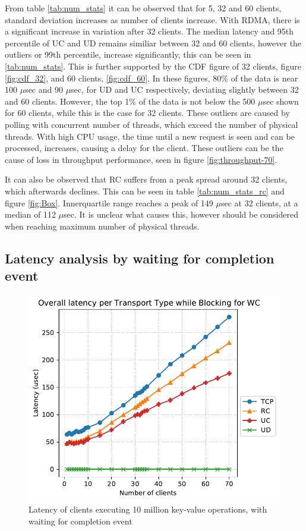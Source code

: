 From table \ref{tab:num_stats} it can be observed that for 5, 32 and 60 clients, standard deviation increases as number of clients increase.
With RDMA, there is a significant increase in variation after 32 clients.
The median latency and 95th percentile of UC and UD remains similiar between 32 and 60 clients, however the outliers or 99th percentile, increase significantly, this can be seen in \ref{tab:num_stats}.
This is further supported by the CDF figure of 32 clients, figure \ref{fig:cdf_32}, and 60 clients, \ref{fig:cdf_60}.
In these figures, 80\% of the data is near 100 $\mu$sec and 90 $\mu$sec, for UD and UC respectively, deviating slightly between 32 and 60 clients.
However, the top 1\% of the data is not below the 500 $\mu$sec shown for 60 clients, while this is the case for 32 clients.
These outliers are caused by polling with concurrent number of threads, which exceed the number of physical threads.
With high CPU usage, the time until a new request is seen and can be processed, increases, causing a delay for the client.
These outliers can be the cause of loss in throughput performance, seen in figure \ref{fig:throughput-70}.

It can also be observed that RC suffers from a peak spread around 32 clients, which afterwards declines.
This can be seen in table \ref{tab:num_stats_rc} and figure \ref{fig:Box}.
Innerquartile range reaches a peak of 149 $\mu$sec at 32 clients, at a median of 112 $\mu$sec.
It is unclear what causes this, however should be considered when reaching maximum number of physical threads.

\subsection{Latency analysis by waiting for completion event}

\begin{figure}
    \centering
    \includegraphics[width=\columnwidth]{figures/PDF/Latency_avg_70_blocking}
    \caption{Latency of clients executing 10 million key-value operations, with waiting for completion event}
    \label{fig:latency-70-block}
\end{figure}

